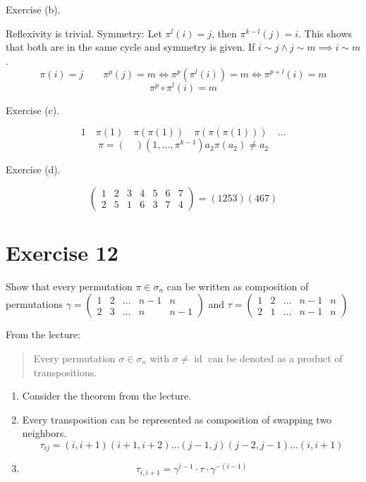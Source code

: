 \documentclass[a4paper]{article}
\theoremstyle{definition}
\begin{document}
Exercise (b).

Reflexivity is trivial.
Symmetry: Let $\pi^l(i) = j$, then $\pi^{k-l}(j) = i$. This shows that both are in the same cycle and symmetry is given.
If $i \sim j \land j \sim m \implies i \sim m$.
\[ \pi(i) = j \qquad \pi^p(j) = m \iff \pi^p(\pi^l(i)) = m \iff \pi^{p+l}(i) = m \]
\[ \pi^p \circ \pi^l(i) = m \]

Exercise (c).

\[ 1 \quad \pi(1) \quad \pi(\pi(1)) \quad \pi(\pi(\pi(1))) \quad \dots \]
\[ \pi = (\quad)  (1, \dots, \pi^{k-1}) a_2 \pi(a_2) \neq a_2 \]

Exercise (d).

\[ \begin{pmatrix} 1 & 2 & 3 & 4 & 5 & 6 & 7 \\ 2 & 5 & 1 & 6 & 3 & 7 & 4 \end{pmatrix} = (1253) (467) \]

\section*{Exercise 12}
\begin{ex}
  Show that every permutation $\pi \in \sigma_n$ can be written as composition of permutations
  $\gamma = \begin{pmatrix} 1 & 2 & \dots & n-1 & n \\ 2 & 3 & \dots & n & n-1 \end{pmatrix}$
  and $\tau = \begin{pmatrix} 1 & 2 & \dots & n-1 & n \\ 2 & 1 & \dots & n-1 & n \end{pmatrix}$
\end{ex}

From the lecture:
\begin{quote}
  Every permutation $\sigma \in \sigma_n$ with $\sigma \neq \operatorname{id}$ can be denoted as a product of transpositions.
\end{quote}

\begin{enumerate}
  \item Consider the theorem from the lecture.
  \item Every transposition can be represented as composition of swapping two neighbors.
    \[ \tau_{ij} = (i, i+1) (i+1, i+2) \dots (j-1, j) (j-2, j-1) \dots (i, i+1) \]
  \item
    \[ \tau_{i,i+1} = \gamma^{i-1} \cdot \tau \cdot \gamma^{-(i-1)} \]
\end{enumerate}
\end{document}
